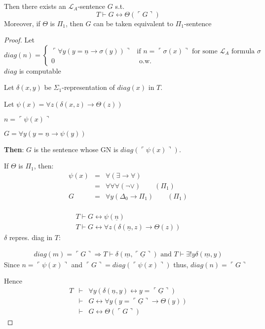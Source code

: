 \documentclass[12pt]{article}
\newcommand{\proves}{\vdash}
\newcommand{\gn}[1]{\ulcorner #1 \urcorner}
\begin{document}
Then there exists an $\mathcal{L}_A$-sentence $G$ s.t.
\[
T \proves G \leftrightarrow \Theta(\gn{G})
\]
Moreover, if $\Theta$ is $\Pi_1$, then $G$ can be taken equivalent to $\Pi_1$-sentence
\begin{proof}
  Let 
  \[
  diag(n) =
  \begin{cases}
    \gn{\forall y ( y=\underline{n} \rightarrow \sigma(y))}
   &\text{if $n = \gn{\sigma(x)}$ for some $\mathcal{L}_A$ formula $\sigma$} \\
   0 &\text{ o.w.}
  \end{cases}
  \]
  $diag$ is computable

  Let $\delta(x,y)$ be $\Sigma_1$-representation of $diag(x)$ in $T$.

  Let $\psi(x) = \forall z \left( \delta(x,z) \rightarrow \Theta(z) \right)$

  $n = \gn{\psi(x)}$

  $G = \forall y \left( y = \underline{n} \rightarrow \psi(y) \right)$

  \textbf{Then}: $G$ is the sentence whose GN is $diag(\gn{\psi(x)})$.

  If $\Theta$ is $\Pi_1$, then:
  \begin{align*}
    \psi(x) &=& \forall ( \exists \rightarrow \forall) \\
            &=& \forall \forall \forall (\neg \vee) \qquad (\Pi_1) \\
            G &=&  \forall y ( \Delta_0 \rightarrow \Pi_1) \qquad (\Pi_1) \\
  \end{align*}

\begin{align}
  T \proves G \leftrightarrow \psi(\underline{n}) \\
  \label{eq:star}
  T \proves G \leftrightarrow \forall z (\delta(\underline{n}, z) \rightarrow \Theta(z))
\end{align}
$\delta$ repres. diag in $T$:

\begin{align*}
  diag(m) = 
  \gn{G} \Rightarrow T \proves \delta(\underline{m}, \underline{\gn{G}})
  \text{ and } T \proves \exists !y \delta(\underline{m},y)
\end{align*}
Since $n = \gn{\psi(x)}$ and $\gn{G} = diag(\gn{\psi(x)})$
thus, $diag(n) = \gn{G}$

Hence 
\begin{align*}
  T &\proves& \forall y \left( \delta(\underline{n}, y) \leftrightarrow
  y = \underline{\gn{G}} \right) \\
  &\proves& G \leftrightarrow \forall y (y = \underline{\gn{G}} \rightarrow \Theta(y)) \\
  &\proves& G \leftrightarrow \Theta(\gn{G})
\end{align*}
\end{proof}
\end{document}
